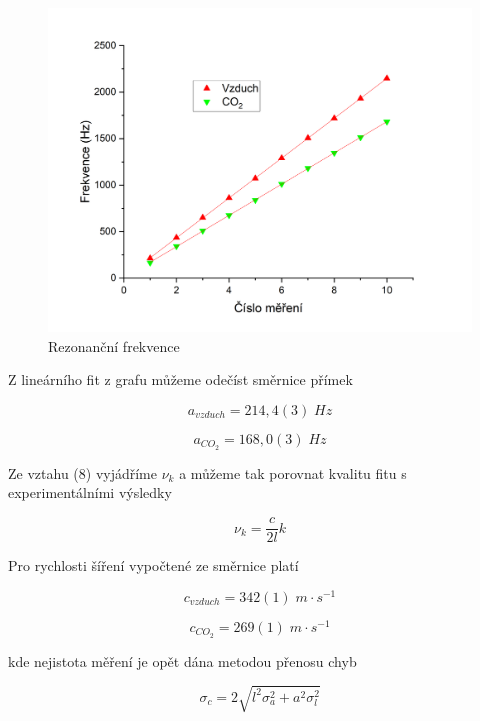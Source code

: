 \begin{figure}[h]
    \centering
    \includegraphics[width=0.85\linewidth]{10 - Rychlost šíření zvuku//Protokol//img/Rezonanční frekvence.png}
    \caption{Rezonanční frekvence}
    \label{fig:rezonanční-frekvence}
\end{figure}

Z lineárního fit z grafu můžeme odečíst směrnice přímek

\begin{equation}
    \nonumber
    a_{vzduch} = 214,4(3) \; Hz
\end{equation}

\begin{equation}
    \nonumber
    a_{CO_2} = 168,0(3) \; Hz
\end{equation}

Ze vztahu (8) vyjádříme \(\nu_k\) a můžeme tak porovnat kvalitu fitu s experimentálními výsledky

\begin{equation}
    \nu_k = \frac{c}{2l} k
\end{equation}

Pro rychlosti šíření vypočtené ze směrnice platí

\begin{equation}
    \nonumber
    c_{vzduch} = 342(1) \; m \cdot s^{-1}
\end{equation}

\begin{equation}
    \nonumber
    c_{CO_2} = 269(1) \; m \cdot s^{-1}
\end{equation}

kde nejistota měření je opět dána metodou přenosu chyb

\begin{equation}
    \sigma_c = 2\sqrt{l^2 \sigma^2_a + a^2 \sigma^2_l}
\end{equation}

